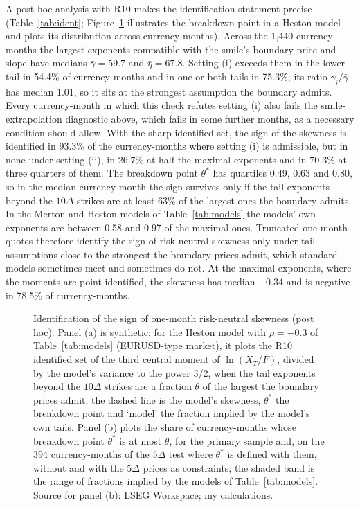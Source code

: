 \documentclass[11pt]{article}
\theoremstyle{result}
\newcommand{\D}{\Delta}
\begin{document}
A post hoc analysis with R10 makes the identification statement precise (Table~\ref{tab:ident}; Figure~\ref{fig:theta} illustrates the breakdown point in a Heston model and plots its distribution across currency-months). Across the 1,440 currency-months the largest exponents compatible with the smile's boundary price and slope have medians $\bar\gamma=59.7$ and $\bar\eta=67.8$. Setting (i) exceeds them in the lower tail in 54.4\% of currency-months and in one or both tails in 75.3\%; its ratio $\gamma_i/\bar\gamma$ has median 1.01, so it sits at the strongest assumption the boundary admits. Every currency-month in which this check refutes setting (i) also fails the smile-extrapolation diagnostic above, which fails in some further months, as a necessary condition should allow. With the sharp identified set, the sign of the skewness is identified in 93.3\% of the currency-months where setting (i) is admissible, but in none under setting (ii), in 26.7\% at half the maximal exponents and in 70.3\% at three quarters of them. The breakdown point $\theta^*$ has quartiles 0.49, 0.63 and 0.80, so in the median currency-month the sign survives only if the tail exponents beyond the $10\D$ strikes are at least 63\% of the largest ones the boundary admits. In the Merton and Heston models of Table~\ref{tab:models} the models' own exponents are between 0.58 and 0.97 of the maximal ones. Truncated one-month quotes therefore identify the sign of risk-neutral skewness only under tail assumptions close to the strongest the boundary prices admit, which standard models sometimes meet and sometimes do not. At the maximal exponents, where the moments are point-identified, the skewness has median $-0.34$ and is negative in 78.5\% of currency-months.

\begin{figure}[t]
\centering

\caption{Identification of the sign of one-month risk-neutral skewness (post hoc). Panel (a) is synthetic: for the Heston model with $\rho=-0.3$ of Table~\ref{tab:models} (EURUSD-type market), it plots the R10 identified set of the third central moment of $\ln(X_T/F)$, divided by the model's variance to the power 3/2, when the tail exponents beyond the $10\D$ strikes are a fraction $\theta$ of the largest the boundary prices admit; the dashed line is the model's skewness, $\theta^*$ the breakdown point and `model' the fraction implied by the model's own tails. Panel (b) plots the share of currency-months whose breakdown point $\theta^*$ is at most $\theta$, for the primary sample and, on the 394 currency-months of the $5\D$ test where $\theta^*$ is defined with them, without and with the $5\D$ prices as constraints; the shaded band is the range of fractions implied by the models of Table~\ref{tab:models}. Source for panel (b): LSEG Workspace; my calculations.}\label{fig:theta}
\end{figure}
\end{document}
